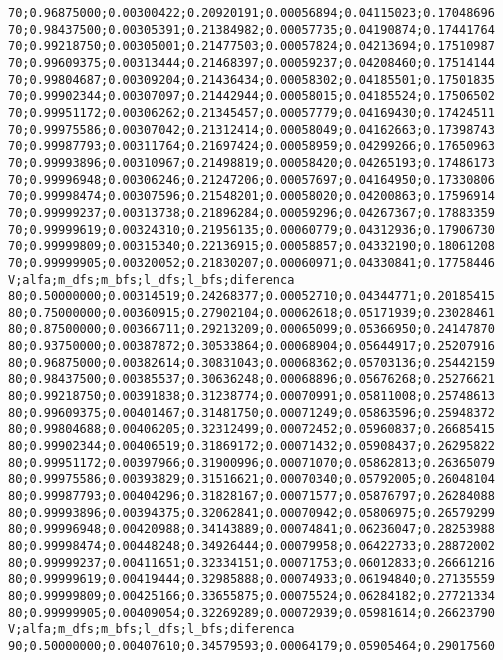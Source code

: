 \documentclass[brazil,times]{abnt}
\begin{document}
{\begin{verbatim}
70;0.96875000;0.00300422;0.20920191;0.00056894;0.04115023;0.17048696
70;0.98437500;0.00305391;0.21384982;0.00057735;0.04190874;0.17441764
70;0.99218750;0.00305001;0.21477503;0.00057824;0.04213694;0.17510987
70;0.99609375;0.00313444;0.21468397;0.00059237;0.04208460;0.17514144
70;0.99804687;0.00309204;0.21436434;0.00058302;0.04185501;0.17501835
70;0.99902344;0.00307097;0.21442944;0.00058015;0.04185524;0.17506502
70;0.99951172;0.00306262;0.21345457;0.00057779;0.04169430;0.17424511
70;0.99975586;0.00307042;0.21312414;0.00058049;0.04162663;0.17398743
70;0.99987793;0.00311764;0.21697424;0.00058959;0.04299266;0.17650963
70;0.99993896;0.00310967;0.21498819;0.00058420;0.04265193;0.17486173
70;0.99996948;0.00306246;0.21247206;0.00057697;0.04164950;0.17330806
70;0.99998474;0.00307596;0.21548201;0.00058020;0.04200863;0.17596914
70;0.99999237;0.00313738;0.21896284;0.00059296;0.04267367;0.17883359
70;0.99999619;0.00324310;0.21956135;0.00060779;0.04312936;0.17906730
70;0.99999809;0.00315340;0.22136915;0.00058857;0.04332190;0.18061208
70;0.99999905;0.00320052;0.21830207;0.00060971;0.04330841;0.17758446
V;alfa;m_dfs;m_bfs;l_dfs;l_bfs;diferenca
80;0.50000000;0.00314519;0.24268377;0.00052710;0.04344771;0.20185415
80;0.75000000;0.00360915;0.27902104;0.00062618;0.05171939;0.23028461
80;0.87500000;0.00366711;0.29213209;0.00065099;0.05366950;0.24147870
80;0.93750000;0.00387872;0.30533864;0.00068904;0.05644917;0.25207916
80;0.96875000;0.00382614;0.30831043;0.00068362;0.05703136;0.25442159
80;0.98437500;0.00385537;0.30636248;0.00068896;0.05676268;0.25276621
80;0.99218750;0.00391838;0.31238774;0.00070991;0.05811008;0.25748613
80;0.99609375;0.00401467;0.31481750;0.00071249;0.05863596;0.25948372
80;0.99804688;0.00406205;0.32312499;0.00072452;0.05960837;0.26685415
80;0.99902344;0.00406519;0.31869172;0.00071432;0.05908437;0.26295822
80;0.99951172;0.00397966;0.31900996;0.00071070;0.05862813;0.26365079
80;0.99975586;0.00393829;0.31516621;0.00070340;0.05792005;0.26048104
80;0.99987793;0.00404296;0.31828167;0.00071577;0.05876797;0.26284088
80;0.99993896;0.00394375;0.32062841;0.00070942;0.05806975;0.26579299
80;0.99996948;0.00420988;0.34143889;0.00074841;0.06236047;0.28253988
80;0.99998474;0.00448248;0.34926444;0.00079958;0.06422733;0.28872002
80;0.99999237;0.00411651;0.32334151;0.00071753;0.06012833;0.26661216
80;0.99999619;0.00419444;0.32985888;0.00074933;0.06194840;0.27135559
80;0.99999809;0.00425166;0.33655875;0.00075524;0.06284182;0.27721334
80;0.99999905;0.00409054;0.32269289;0.00072939;0.05981614;0.26623790
V;alfa;m_dfs;m_bfs;l_dfs;l_bfs;diferenca
90;0.50000000;0.00407610;0.34579593;0.00064179;0.05905464;0.29017560

\end{verbatim}}
\end{document}
